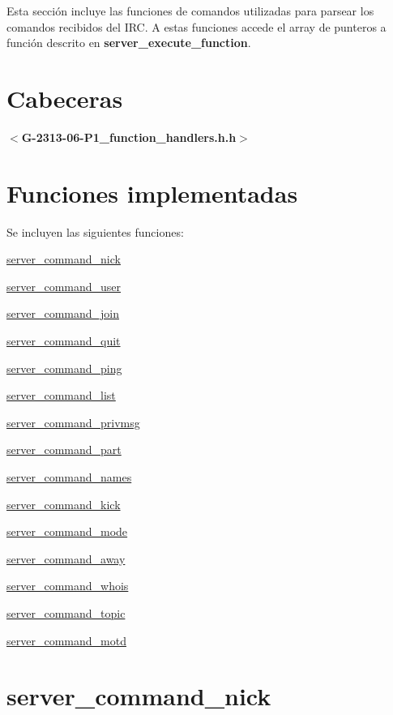 Esta sección incluye las funciones de comandos utilizadas para parsear los comandos recibidos del I\+R\+C. A estas funciones accede el array de punteros a función descrito en {\bfseries server\+\_\+execute\+\_\+function}.\hypertarget{server_commands_cabeceras3}{}\section{Cabeceras}\label{server_commands_cabeceras3}
{ {\bfseries $<$G-\/2313-\/06-\/\+P1\+\_\+function\+\_\+handlers.\+h.\+h$>$} } \hypertarget{server_commands_functions3}{}\section{Funciones implementadas}\label{server_commands_functions3}
Se incluyen las siguientes funciones\+: 
\begin{DoxyItemize}
\item \hyperlink{server_command_nick}{server\+\_\+command\+\_\+nick} 
\item \hyperlink{server_command_user}{server\+\_\+command\+\_\+user} 
\item \hyperlink{server_command_join}{server\+\_\+command\+\_\+join} 
\item \hyperlink{server_command_quit}{server\+\_\+command\+\_\+quit} 
\item \hyperlink{server_command_ping}{server\+\_\+command\+\_\+ping} 
\item \hyperlink{server_command_list}{server\+\_\+command\+\_\+list} 
\item \hyperlink{server_command_privmsg}{server\+\_\+command\+\_\+privmsg} 
\item \hyperlink{server_command_part}{server\+\_\+command\+\_\+part} 
\item \hyperlink{server_command_names}{server\+\_\+command\+\_\+names} 
\item \hyperlink{server_command_kick}{server\+\_\+command\+\_\+kick} 
\item \hyperlink{server_command_mode}{server\+\_\+command\+\_\+mode} 
\item \hyperlink{server_command_away}{server\+\_\+command\+\_\+away} 
\item \hyperlink{server_command_whois}{server\+\_\+command\+\_\+whois} 
\item \hyperlink{server_command_topic}{server\+\_\+command\+\_\+topic} 
\item \hyperlink{server_command_motd}{server\+\_\+command\+\_\+motd} 
\end{DoxyItemize}\hypertarget{server_command_nick}{}\section{server\+\_\+command\+\_\+nick}\label{server_command_nick}
